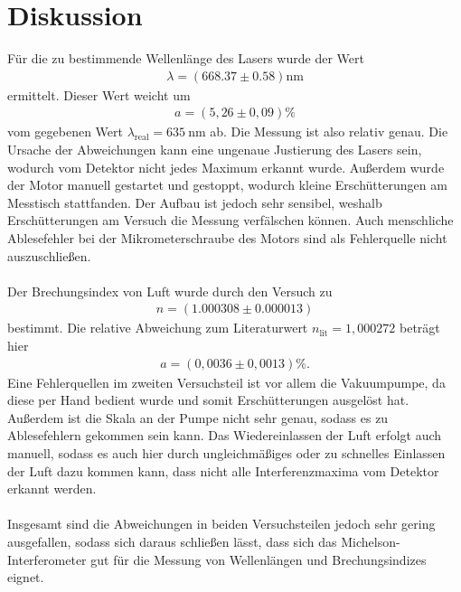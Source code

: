 \section{Diskussion}
\label{sec:Diskussion}

Für die zu bestimmende Wellenlänge des Lasers wurde der Wert
\begin{align*}
    \lambda= (668.37 \pm 0.58 )\si{\nano\meter}    
\end{align*}
ermittelt. Dieser Wert weicht um
\begin{align*}
    a=(5,26 \pm 0,09) \si{\percent}
\end{align*}
vom gegebenen Wert $\lambda_{\text{real}}=\qty{635}{\nano\meter}$ ab. 
Die Messung ist also relativ genau.
Die Ursache der Abweichungen kann eine ungenaue Justierung des Lasers sein, wodurch vom Detektor nicht jedes Maximum erkannt wurde.
Außerdem wurde der Motor manuell gestartet und gestoppt, wodurch kleine Erschütterungen am Messtisch stattfanden. Der Aufbau ist jedoch
sehr sensibel, weshalb Erschütterungen am Versuch die Messung verfälschen können.
Auch menschliche Ablesefehler bei der Mikrometerschraube des Motors sind als Fehlerquelle nicht auszuschließen.\\
\\  
Der Brechungsindex von Luft wurde durch den Versuch zu
\begin{align*}
    n= (1.000308 \pm 0.000013)
\end{align*}
bestimmt.
Die relative Abweichung zum Literaturwert $n_{\text{lit}}= 1,000272$ \cite{Brechungsindex} beträgt hier 
\begin{align*}
    a=(0,0036 \pm 0,0013) \si{\percent}. 
\end{align*}
Eine Fehlerquellen im zweiten Versuchsteil ist vor allem die Vakuumpumpe, da diese per Hand bedient wurde und somit Erschütterungen
ausgelöst hat. Außerdem ist die Skala an der Pumpe nicht sehr genau, sodass es zu Ablesefehlern gekommen sein kann.
Das Wiedereinlassen der Luft erfolgt auch manuell, sodass es auch hier durch ungleichmäßiges oder zu schnelles Einlassen der Luft dazu kommen kann,
dass nicht alle Interferenzmaxima vom Detektor erkannt werden. \\
\\
Insgesamt sind die Abweichungen in beiden Versuchsteilen jedoch sehr gering ausgefallen, sodass sich daraus schließen lässt,
dass sich das Michelson-Interferometer gut für die Messung von Wellenlängen und Brechungsindizes eignet.
